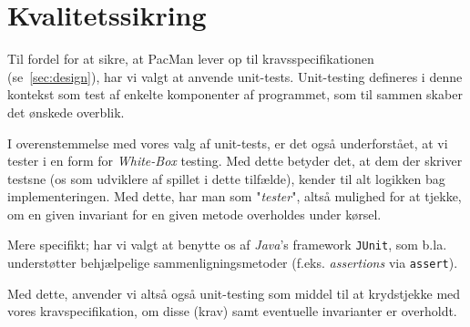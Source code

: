 \documentclass{article}
\newcommand{\code}[1]{\small\texttt{#1}}
\theoremstyle{mytheoremstyle}
\theoremstyle{mytheoremstyle}
\theoremstyle{myproblemstyle}
\begin{document}


\section{Kvalitetssikring}\label{sec:Kvalitetssikring} %
Til fordel for at sikre, at PacMan lever op til kravsspecifikationen
(se \autoref{sec:design}), har vi valgt at anvende unit-tests. Unit-testing
defineres i denne kontekst som test af enkelte komponenter af programmet, som
til sammen skaber det ønskede overblik.

I overenstemmelse med vores valg af unit-tests, er det også underforstået, at vi
tester i en form for \textit{White-Box} testing. Med dette betyder det, at dem der
skriver testsne (os som udviklere af spillet i dette tilfælde), kender til alt
logikken bag implementeringen. Med dette, har man som "\textit{tester}", altså
mulighed for at tjekke, om en given invariant for en given metode overholdes
under kørsel.

Mere specifikt; har vi valgt at benytte os af \textit{Java}'s framework
\texttt{JUnit}, som b.la. understøtter behjælpelige sammenligningsmetoder (f.eks.
\textit{assertions} via \code{assert}).

Med dette, anvender vi altså også unit-testing som middel til at krydstjekke med
vores kravspecifikation, om disse (krav) samt eventuelle invarianter er
overholdt.
\end{document}
